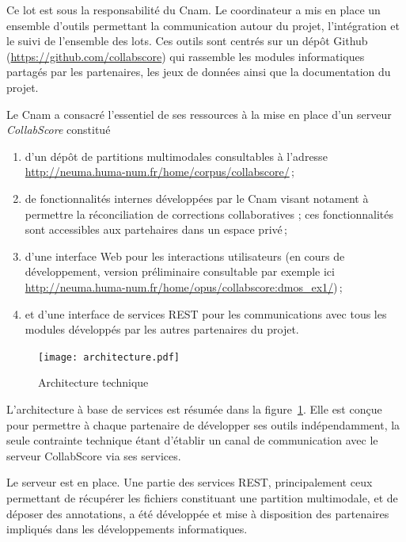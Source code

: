\documentclass[11pt]{article}
\begin{document}
Ce lot est sous la responsabilité du Cnam. Le coordinateur a mis en place un ensemble d'outils permettant 
la communication autour du projet, l'intégration et le suivi de l'ensemble des lots. Ces outils sont
centrés sur un dépôt Github (\url{https://github.com/collabscore})
qui rassemble les modules informatiques partagés par les partenaires, les jeux de données 
ainsi que la documentation du projet.

Le Cnam a consacré l'essentiel de ses ressources à la mise en place d'un serveur \emph{CollabScore} constitué

\begin{enumerate}
 \item d'un dépôt de partitions multimodales consultables à l'adresse \url{http://neuma.huma-num.fr/home/corpus/collabscore/}\,;
  \item  de fonctionnalités internes développées par le Cnam visant notament à permettre la réconciliation 
       de corrections collaboratives ; ces fonctionnalités sont accessibles aux partehaires dans un espace privé\,;
   \item  d'une interface Web pour les interactions utilisateurs (en cours de développement, version
         préliminaire consultable par exemple ici \url{http://neuma.huma-num.fr/home/opus/collabscore:dmos_ex1/})\,; 
  \item et d'une interface de services REST pour les communications avec tous les modules développés par les autres 
      partenaires du projet.
\end{enumerate}

  \begin{figure}[htb]
  \begin{center}
   \texttt{[image: architecture.pdf]}
    \caption{Architecture technique}
    \label{architecture}
    \end{center}
  \end{figure}
  
L'architecture à base de services est résumée dans la figure~\ref{architecture}.
Elle est conçue pour permettre à chaque partenaire de développer ses outils indépendamment, 
la seule contrainte technique étant
d'établir un canal de communication avec le serveur CollabScore via ses services.  

Le serveur est en place. Une partie des services REST, principalement ceux permettant 
de récupérer les fichiers constituant une partition multimodale, et de déposer des annotations, a 
été développée et mise à disposition des partenaires impliqués dans les développements informatiques.
\end{document}
